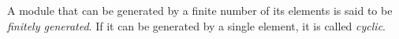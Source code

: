 A module that can be generated by a finite number of its elements is said to be \emph{finitely generated}. If it can be generated by a single element, it is called \emph{cyclic}.
